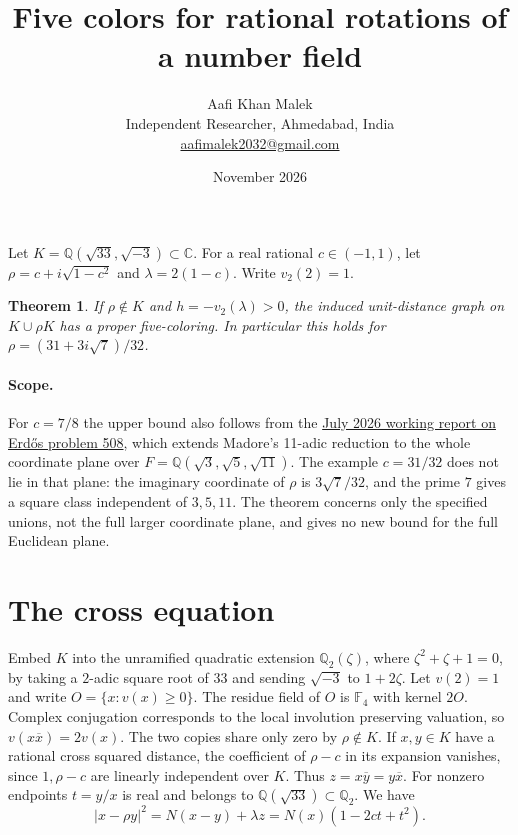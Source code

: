 \documentclass[10pt,letterpaper]{article}
\title{Five colors for rational rotations of a number field}
\author{Aafi Khan Malek\\\small Independent Researcher, Ahmedabad, India\\
\small\href{mailto:aafimalek2032@gmail.com}{aafimalek2032@gmail.com}}
\date{November 2026}
\newtheorem{theorem}{Theorem}
\begin{document}
\maketitle
Let \(K=\mathbb Q(\sqrt{33},\sqrt{-3})\subset\mathbb C\). For a
real rational \(c\in(-1,1)\), let \(\rho=c+i\sqrt{1-c^2}\)
and \(\lambda=2(1-c)\). Write \(v_2(2)=1\).
\begin{theorem}
If \(\rho\notin K\) and \(h=-v_2(\lambda)>0\), the induced
unit-distance graph on \(K\cup\rho K\) has a proper five-coloring.
In particular this holds for
\(\rho=(31+3i\sqrt7)/32\).
\end{theorem}
\paragraph{Scope.}
For \(c=7/8\) the upper bound also follows from the
\href{https://www.erdosproblemaday.com/report/508}{July 2026 working
report on Erd\H{o}s problem 508}, which extends Madore's 11-adic
reduction to the whole coordinate plane over
\(F=\mathbb Q(\sqrt3,\sqrt5,\sqrt{11})\). The example \(c=31/32\)
does not lie in that plane: the imaginary coordinate of \(\rho\)
is \(3\sqrt7/32\), and the prime \(7\) gives a square class
independent of \(3,5,11\). The theorem concerns only the
specified unions, not the full larger coordinate plane,
and gives no new bound for the full Euclidean plane.

\section*{The cross equation}
Embed \(K\) into the unramified quadratic extension
\(\mathbb Q_2(\zeta)\), where \(\zeta^2+\zeta+1=0\), by taking
a \(2\)-adic square root of 33 and sending \(\sqrt{-3}\) to
\(1+2\zeta\). Let \(v(2)=1\) and write \(O=\{x:v(x)\ge0\}\).
The residue field of \(O\) is \(\mathbb F_4\) with kernel \(2O\).
Complex conjugation corresponds to the local involution preserving
valuation, so \(v(x\overline x)=2v(x)\).
The two copies share only zero by \(\rho\notin K\).
If \(x,y\in K\) have a rational cross squared distance, the coefficient
of \(\rho-c\) in its expansion vanishes, since \(1,\rho-c\) are linearly
independent over \(K\). Thus \(z=x\overline y=y\overline x\).
For nonzero endpoints \(t=y/x\) is real and belongs to
\(\mathbb Q(\sqrt{33})\subset\mathbb Q_2\). We have
\[
 |x-\rho y|^2=N(x-y)+\lambda z=N(x)(1-2ct+t^2).
 \tag{1}
\]
\end{document}
